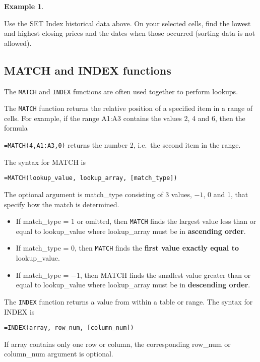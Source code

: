 \documentclass[
]{article}
\theoremstyle{definition}
\theoremstyle{definition}
\newtheorem{example}{Example}[section]
\theoremstyle{definition}
\theoremstyle{definition}
\theoremstyle{remark}
\begin{document}
\begin{example}
\protect\hypertarget{exm:unlabeled-div-10}{}\label{exm:unlabeled-div-10}

Use the SET Index historical data above. On your selected cells, find
the lowest and highest closing prices and the dates when those occurred
(sorting data is not allowed).

\end{example}

\hypertarget{match-and-index-functions}{%
\subsection{MATCH and INDEX functions}\label{match-and-index-functions}}

The \texttt{MATCH} and \texttt{INDEX} functions are often used together to perform
lookups.

The \texttt{MATCH} function returns the relative position of a specified item in
a range of cells. For example, if the range A1:A3 contains the values 2,
4 and 6, then the formula

\texttt{=MATCH(4,A1:A3,0)} returns the number 2, i.e.~the second item in the
range.

The syntax for MATCH is

\texttt{=MATCH(lookup\_value,\ lookup\_array,\ {[}match\_type{]})}

The optional argument is match\_type consisting of 3 values, \(-1\), 0 and
1, that specify how the match is determined.

\begin{itemize}
\item
  If match\_type = 1 or omitted, then \texttt{MATCH} finds the largest value
  less than or equal to lookup\_value where lookup\_array must be in
  \textbf{ascending order}.
\item
  If match\_type = 0, then \texttt{MATCH} finds the \textbf{first value exactly equal
  to} lookup\_value.
\item
  If match\_type = \(-1\), then MATCH finds the smallest value greater
  than or equal to lookup\_value where lookup\_array must be in
  \textbf{descending order}.
\end{itemize}

The \texttt{INDEX} function returns a value from within a table or range. The
syntax for INDEX is

\texttt{=INDEX(array,\ row\_num,\ {[}column\_num{]})}

If array contains only one row or column, the corresponding row\_num or
column\_num argument is optional.
\end{document}
